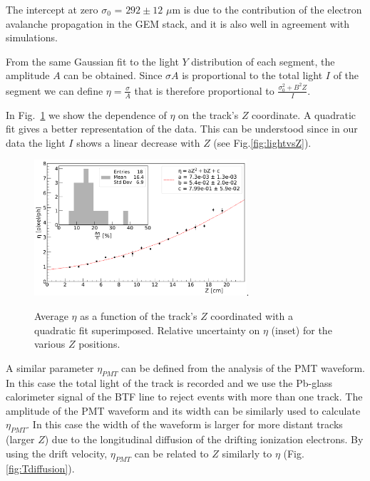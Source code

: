 \documentclass[%
 aip,
 amsmath,amssymb,
 reprint,%
]{revtex4-1}
\begin{document}
 The intercept at zero $\sigma_0$ =  $292 \pm 12$ $\mu$m is due to the contribution of the electron avalanche  propagation in the GEM stack, and it is  also well  in agreement with  simulations. 
 
From the same Gaussian fit to the light  $Y$ distribution of each segment, the amplitude $A$ can be obtained. Since $\sigma A$ is proportional to the total light $I$ of the segment we can  define $\eta = \frac{\sigma}{A}$ that is therefore  proportional to $\frac{\sigma_0^2 + B^2 Z}{I}$.

In Fig.~\ref{fig:etavsZ} we show the dependence of $\eta$ on the track's $Z$ coordinate. A quadratic fit gives a better representation of the data. This can be understood since in our data   the light $I$ shows a  linear decrease with $Z$ (see Fig.\ref{fig:lightvsZ}).
\begin{figure}[ht]
\centering
\includegraphics[width=3.1in]{Fig10-eta-CMOS-Z.pdf}\DeclareGraphicsExtensions.
\caption{ Average $\eta$  as a function of the track's $Z$ coordinated with a quadratic fit superimposed. Relative uncertainty on $\eta$ (inset) for the various $Z$ positions. }
\label{fig:etavsZ}
\end{figure}

A similar parameter $\eta_{PMT}$ can be defined from the analysis of the PMT waveform. In this case the total light of the track is recorded and we use the Pb-glass calorimeter signal of the BTF line to reject  events with  more than one  track. 
The amplitude of the  PMT waveform and its width can be similarly  used to calculate $\eta_{PMT}$. In this case the width of the waveform is larger for more distant tracks (larger $Z$)  due to the longitudinal diffusion of the drifting ionization electrons. By using the drift velocity, $\eta_{PMT}$ can be related to $Z$ similarly to $\eta$ (Fig.\ref{fig:Tdiffusion}).
\end{document}
